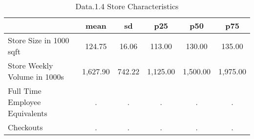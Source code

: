 \begin{table}[htbp]
\caption{\label{clabel} Data.1.4 Store Characteristics}\centering\medskip
\begin{tabular}{lccccc} \hline \hline
 & mean  & sd  & p25  & p50  & p75  \\  \hline 
Store Size in 1000 sqft &       124.75 &        16.06 &       113.00 &       130.00 &       135.00 \\  
Store Weekly Volume in 1000s &     1,627.90 &       742.22 &     1,125.00 &     1,500.00 &     1,975.00 \\  
Full Time Employee Equivalents &            . &            . &            . &            . &            . \\  
Checkouts &            . &            . &            . &            . &            . \\  
\hline \hline \end{tabular}
\end{table}
